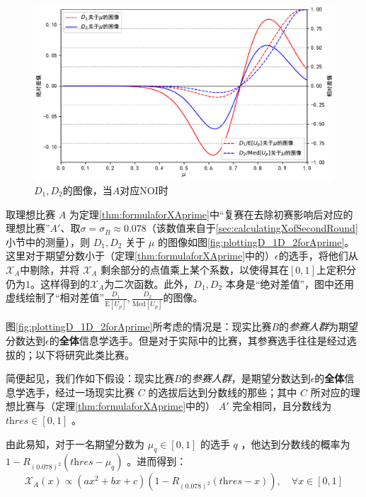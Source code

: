             \begin{figure}[htbp]
                \centering
                \includegraphics[width=\textwidth]{fig/plottingNoiD_1D_2.pdf}
                \caption{$D_1,D_2$的图像，当$A$对应NOI时}
                \label{fig:plottingD_1D_2forNoi}
            \end{figure}

            取理想比赛 $A$ 为定理\ref{thm:formulaforXAprime}中“复赛在去除初赛影响后对应的理想比赛”$A'$、取$\sigma=\sigma_B\approx 0.078$（该数值来自于\ref{sec:calculatingXofSecondRound}小节中的测量），则 $D_1,D_2$ 关于 $\mu$ 的图像如图\ref{fig:plottingD_1D_2forAprime}。这里对于期望分数小于（定理\ref{thm:formulaforXAprime}中的）$\epsilon$的选手，将他们从$\mathcal{X}_A$中剔除，并将 $\mathcal{X}_A$ 剩余部分的点值乘上某个系数，以使得其在$[0,1]$上定积分仍为$1$。这样得到的$\mathcal{X}_A$为二次函数。此外，$D_1,D_2$ 本身是“绝对差值”，图中还用虚线绘制了“相对差值”$\frac{D_1}{\mathrm{E}\left[U_p\right]},\frac{D_2}{\mathrm{Med}\left[U_p\right]}$的图像。

            \vspace{1.5ex}

            图\ref{fig:plottingD_1D_2forAprime}所考虑的情况是：现实比赛$B$的\emph{参赛人群}为期望分数达到$\epsilon$的\textbf{全体}信息学选手。但是对于实际中的比赛，其参赛选手往往是经过选拔的；以下将研究此类比赛。

            简便起见，我们作如下假设：现实比赛$B$的\emph{参赛人群}，是期望分数达到$\epsilon$的\textbf{全体}信息学选手，经过一场现实比赛 $C$ 的选拔后达到分数线的那些；其中 $C$ 所对应的理想比赛与（定理\ref{thm:formulaforXAprime}中的） $A'$ 完全相同，且分数线为 $\textit{thres}\in[0,1]$ 。

            由此易知，对于一名期望分数为 $\mu_q\in [0,1]$ 的选手 $q$ ，他达到分数线的概率为 $1-R_{(0.078)^2}(\textit{thres}-\mu_q)$ 。进而得到：
            $$
            \mathcal{X}_A(x)\propto (ax^2+bx+c)\left(1-R_{(0.078)^2}(\textit{thres}-x)\right),\quad\forall x\in [0,1]
            $$

